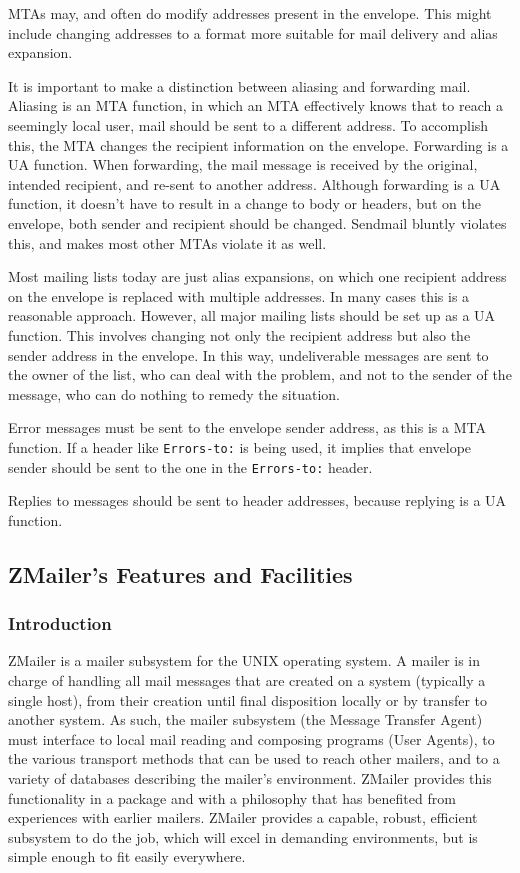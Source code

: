 MTAs may, and often do modify addresses present in the envelope. This might 
include changing addresses to a format more suitable for mail delivery and 
alias expansion.

It is important to make a distinction between aliasing and forwarding mail. 
Aliasing is an MTA function, in which an MTA effectively knows that to reach 
a seemingly local user, mail should be sent to a different address. 
To accomplish this, the MTA changes the recipient information on the envelope. 
Forwarding is a UA function. When forwarding, the mail message is received 
by the original, intended recipient, and re-sent to another address. Although 
forwarding is a UA function, it doesn't have to result in a change to body or 
headers, but on the envelope, both sender and recipient should be changed. 
Sendmail bluntly violates this, and makes most other MTAs violate it as well.

Most mailing lists today are just alias expansions, on which one recipient 
address on the envelope is replaced with multiple addresses. In many cases 
this is a reasonable approach. However, all major mailing lists should be 
set up as a UA function. This involves changing not only the recipient 
address but also the sender address in the envelope. In this way, 
undeliverable messages are sent to the owner of the list, who can deal 
with the problem, and not to the sender of the message, who can do nothing 
to remedy the situation.

Error messages must be sent to the envelope sender address, as this is a 
MTA function. If a header like {\tt Errors-to:} is being used, it implies 
that envelope sender should be sent to the one in the {\tt Errors-to:} header.

Replies to messages should be sent to header addresses, because replying is 
a UA function.




\subsection{ZMailer's Features and Facilities}




\subsubsection{Introduction}

ZMailer is a mailer subsystem for the UNIX operating system.  A mailer is in
charge of handling all mail messages that are created on a system
(typically a single host), from their creation until final disposition
locally or by transfer to another system. As such, the mailer subsystem
(the Message Transfer Agent) must interface to local mail reading and
composing programs (User Agents), to the various transport methods that can
be used to reach other mailers, and to a variety of databases describing
the mailer's environment. ZMailer provides this functionality in a package
and with a philosophy that has benefited from experiences with earlier
mailers. ZMailer provides a capable, robust, efficient subsystem to do the
job, which will excel in demanding environments, but is simple enough to
fit easily everywhere.




